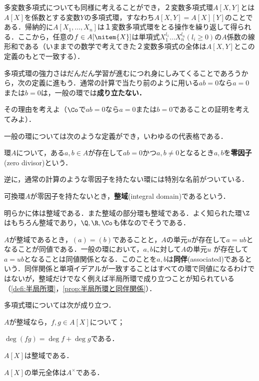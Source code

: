 多変数多項式についても同様に考えることができ，２変数多項式環$A[X,Y]$とは$A[X]$を係数とする変数$Y$の多項式環，すなわち$A[X,Y]=A[X][Y]$のことである．帰納的に$A[X_1,\dots,X_n]$は１変数多項式環をとる操作を繰り返して得られる．ここから，任意の$f\in A[\nitem{X}]$は単項式$X_1^{l_1}\dots X_n^{l_n} (l_i\geq0)$の$A$係数の線形和である（いままでの数学で考えてきた２変数多項式の全体は$A[X,Y]$とこの定義のもとで一致する）．

多項式環の強力さはだんだん学習が進むにつれ身にしみてくることであろうから，次の定義に進もう．通常の計算で当たり前のように用いる$ab=0$なら$a=0$または$b=0$は，一般の環では\textbf{成り立たない．}

\begin{exer}
	その理由を考えよ（$\Co$で$ab=0$なら$a=0$または$b=0$であることの証明を考えてみよ）．
\end{exer}

一般の環については次のような定義ができ，いわゆるの代表格である．

\begin{defi}[零因子]
	環$A$について，ある$a,b\in A$が存在して$ab=0$かつ$a,b\neq0$となるとき$a,b$を\textbf{零因子}(zero divisor)という．
\end{defi}

逆に，通常の計算のような零因子を持たない環には特別な名前がついている．

\begin{defi}[整域]
	可換環$A$が零因子を持たないとき，\textbf{整域}(integral domain)であるという．
\end{defi}

明らかに体は整域である．また整域の部分環も整域である．よく知られた環$\Z$はもちろん整域であり，$\Q, \R, \Co$も体なのでそうである．

$A$が整域であるとき，$(a)=(b)$であることと，$A$の単元$u$が存在して$a=ub$となることが同値である．一般の環において，$a,b$に対して$A$の単元$u$
が存在して$a=ub$となることは同値関係となる．このことを$a,b$は\textbf{同伴}(associated)であるという．同伴関係と単項イデアルが一致することはすべての環で同値になるわけではないが，整域だけでなく例えば半局所環で成り立つことが知られている（\ref{defi:半局所環}，\ref{prop:半局所環と同伴関係}）．

多項式環については次が成り立つ．

\begin{prop}
	$A$が整域なら，$f,g\in A[X]$について；
	\begin{sakura}
		\item $\deg(fg)=\deg f+\deg g$である．
		\item $A[X]$は整域である．
		\item $A[X]$の単元全体は$A^\times$である．
	\end{sakura}
\end{prop}

